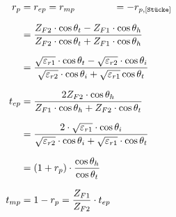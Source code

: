 \begin{equation*}
			\setlength{\jot}{10pt}
\begin{aligned}
	r_p    & =  r_{ep} = r_{mp} \qquad \qquad =-r_{p,[\texttt{Stücke}]}                                                                                                                                                                                                        \\
	& = \frac{Z_{F2} \cdot \cos \theta_t-Z_{F1} \cdot \cos \theta_h}{Z_{F2} \cdot \cos \theta_t+Z_{F1} \cdot \cos \theta_h}                                                                                               \\
	& = \frac{\sqrt{\varepsilon_{r1}}\cdot\cos\theta_t - \sqrt{\varepsilon_{r2}}\cdot\cos\theta_i}{\sqrt{\varepsilon_{r2}}\cdot\cos\theta_i + \sqrt{\varepsilon_{r1}}\cos\theta_t} \\
	t_{ep} & =  \frac{2 Z_{F2} \cdot \cos \theta_h}{Z_{F1} \cdot \cos \theta_h+Z_{F2} \cdot \cos \theta_t}                                                                                                                          \\
		 & = \frac{2\cdot\sqrt{\varepsilon_{r1}}\cdot\cos\theta_i}{\sqrt{\varepsilon_{r2}}\cdot\cos\theta_i + \sqrt{\varepsilon_{r1}}\cdot\cos\theta_t}\\
	& = (1+r_p) \cdot \dfrac{\cos \theta_h}{\cos \theta_t}\\
	t_{mp} 
	& = 1-r_p                                                                                                                                                                                                                                                                                                                                                                                        = \frac{Z_{F1}}{Z_{F2}}\cdot t_{ep}
\end{aligned}
\end{equation*}


